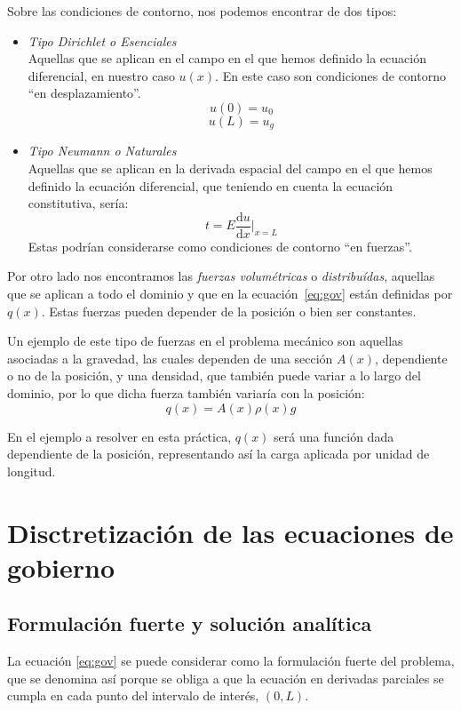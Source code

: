 Sobre las condiciones de contorno, nos podemos encontrar de dos tipos:
\begin{itemize}
\item \textit{Tipo Dirichlet o Esenciales}\\
Aquellas que se aplican en el campo en el que hemos definido la ecuación diferencial, en nuestro caso \(u(x)\). En este caso son condiciones de contorno ``en desplazamiento''.
$$
u(0)=u_0
$$$$
u(L)=u_g
$$
\item \textit{Tipo Neumann o Naturales}\\
Aquellas que se aplican en la derivada espacial del campo en el que hemos definido la ecuación diferencial, que teniendo en cuenta la ecuación constitutiva, sería:
$$
t= E \frac{\mathrm{d} u}{\mathrm{d} x} \biggr\rvert_{x=L}
$$
Estas podrían considerarse como condiciones de contorno ``en fuerzas''.
\end{itemize}

Por otro lado nos encontramos las \textit{fuerzas volumétricas} o  \textit{distribu\'idas}, aquellas que se aplican a todo el dominio y que en la ecuación~\eqref{eq:gov} están definidas por $q(x)$. Estas fuerzas pueden depender de la posición o bien ser constantes.

Un ejemplo de este tipo de fuerzas en el problema mecánico son aquellas asociadas a la gravedad, las cuales dependen de una secci\'on $A(x)$, dependiente o no de la posici\'on, y una densidad, que tambi\'en puede variar a lo largo del dominio, por lo que dicha fuerza tambi\'en variaría con la posición:
$$
q(x) = A(x) \rho(x) g
$$

En el ejemplo a resolver en esta práctica, $q(x)$ será una función dada dependiente de la posición, representando así la carga aplicada por unidad de longitud.

\clearpage
\section{Disctretización de las ecuaciones de gobierno}
\label{sec:disc}

\subsection{Formulación fuerte y solución analítica}
\label{sec:analitica}
La ecuación \eqref{eq:gov} se puede considerar como la formulación fuerte del problema, que se denomina así porque se obliga a que la ecuación en derivadas parciales se cumpla en cada punto del intervalo de interés, $(0,L)$. 

